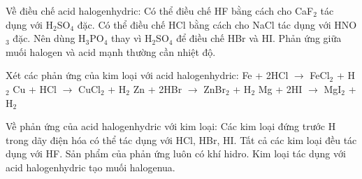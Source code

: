 \documentclass[Main.tex]{subfiles}
\begin{document}
    \begin{ex}
    Về điều chế acid halogenhydric:
    \choiceTF
    {\True Có thể điều chế HF bằng cách cho CaF$_2$ tác dụng với H$_2$SO$_4$ đặc.}
    {Có thể điều chế HCl bằng cách cho NaCl tác dụng với HNO$_3$ đặc.}
    {\True Nên dùng H$_3$PO$_4$ thay vì H$_2$SO$_4$ để điều chế HBr và HI.}
    {\True Phản ứng giữa muối halogen và acid mạnh thường cần nhiệt độ.}
    \end{ex}
    
    \begin{ex}
    Xét các phản ứng của kim loại với acid halogenhydric:
    \choiceTF
    {\True Fe + 2HCl $\rightarrow$ FeCl$_2$ + H$_2$}
    {Cu + HCl $\rightarrow$ CuCl$_2$ + H$_2$}
    {\True Zn + 2HBr $\rightarrow$ ZnBr$_2$ + H$_2$}
    {\True Mg + 2HI $\rightarrow$ MgI$_2$ + H$_2$}
    \end{ex}
    
    \begin{ex}
    Về phản ứng của acid halogenhydric với kim loại:
    \choiceTF
    {\True Các kim loại đứng trước H trong dãy điện hóa có thể tác dụng với HCl, HBr, HI.}
    {Tất cả các kim loại đều tác dụng với HF.}
    {\True Sản phẩm của phản ứng luôn có khí hidro.}
    {\True Kim loại tác dụng với acid halogenhydric tạo muối halogenua.}
    \end{ex}
    
\end{document}
